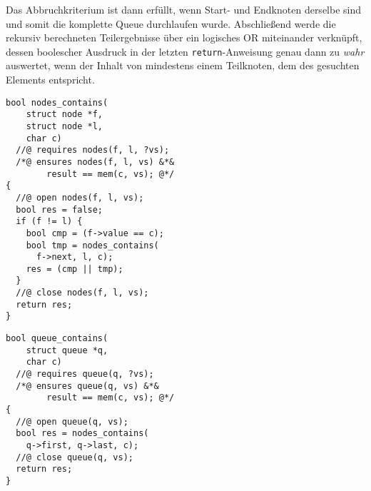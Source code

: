 Das Abbruchkriterium ist dann erfüllt, wenn Start- und Endknoten derselbe sind und somit die komplette Queue durchlaufen wurde. Abschließend werde die rekursiv berechneten Teilergebnisse über ein logisches OR miteinander verknüpft, dessen boolescher Ausdruck in der letzten \texttt{return}-Anweisung genau dann zu \emph{wahr} auswertet, wenn der Inhalt von mindestens einem Teilknoten, dem des gesuchten Elements entspricht.

\vspace{-10pt}
{\noindent
\begin{minipage}[t]{.45\textwidth}
\begin{lstlisting}
bool nodes_contains(
    struct node *f,
    struct node *l,
    char c)
  //@ requires nodes(f, l, ?vs);
  /*@ ensures nodes(f, l, vs) &*&
        result == mem(c, vs); @*/
{
  //@ open nodes(f, l, vs);
  bool res = false;
  if (f != l) {
    bool cmp = (f->value == c);
    bool tmp = nodes_contains(
      f->next, l, c);
    res = (cmp || tmp);
  }
  //@ close nodes(f, l, vs);
  return res;
}
\end{lstlisting}
\end{minipage}
\hfill
\begin{minipage}[t]{.45\textwidth}
\begin{lstlisting}
bool queue_contains(
    struct queue *q,
    char c)
  //@ requires queue(q, ?vs);
  /*@ ensures queue(q, vs) &*&
        result == mem(c, vs); @*/
{
  //@ open queue(q, vs);
  bool res = nodes_contains(
    q->first, q->last, c);
  //@ close queue(q, vs);
  return res;
}
\end{lstlisting}
\end{minipage}
}




